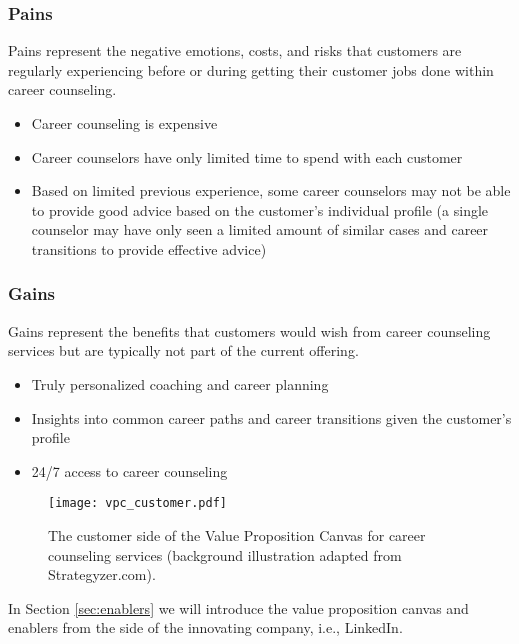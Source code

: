 \subsubsection{Pains}

Pains represent the negative emotions, costs, and risks that customers are regularly experiencing before
or during getting their customer jobs done within career counseling.

\begin{itemize}
    \item Career counseling is expensive
    \item Career counselors have only limited time to spend with each customer
    \item Based on limited previous experience, some career counselors may not be able to provide
        good advice based on the customer's individual profile (a single counselor may have only
        seen a limited amount of similar cases and career transitions to provide effective advice)
\end{itemize}

\subsubsection{Gains}

Gains represent the benefits that customers would wish from career counseling services but are 
typically not part of the current offering.

\begin{itemize}
    \item Truly personalized coaching and career planning
    \item Insights into common career paths and career transitions given the customer's profile
    \item 24/7 access to career counseling
\end{itemize}

\begin{figure}[h!]
    \centering
    \caption{The customer side of the Value Proposition Canvas for career counseling services (background illustration adapted from Strategyzer.com).}
    \label{fig:vpc_customer}
    \texttt{[image: vpc\_customer.pdf]}
\end{figure}

\noindent In Section \ref{sec:enablers} we will introduce the value proposition canvas and enablers from the
side of the innovating company, i.e., LinkedIn.